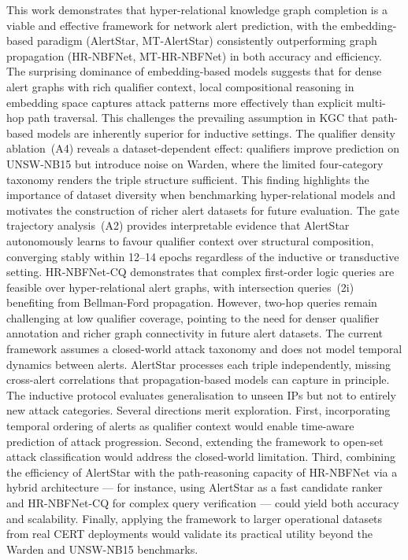 \documentclass[10pt,journal,compsoc]{IEEEtran}
\begin{document}
This work demonstrates that hyper-relational knowledge
graph completion is a viable and effective framework
for network alert prediction, with the embedding-based
paradigm (AlertStar, MT-AlertStar) consistently
outperforming graph propagation (HR-NBFNet,
MT-HR-NBFNet) in both accuracy and efficiency.
The surprising dominance of embedding-based models
suggests that for dense alert graphs with rich
qualifier context, local compositional reasoning in
embedding space captures attack patterns more
effectively than explicit multi-hop path traversal.
This challenges the prevailing assumption in KGC
that path-based models are inherently superior for
inductive settings.
The qualifier density ablation~(A4) reveals a
dataset-dependent effect: qualifiers improve
prediction on UNSW-NB15 but introduce noise on
Warden, where the limited four-category taxonomy
renders the triple structure sufficient. This
finding highlights the importance of dataset
diversity when benchmarking hyper-relational models
and motivates the construction of richer alert
datasets for future evaluation. The gate trajectory
analysis~(A2) provides interpretable evidence that
AlertStar autonomously learns to favour qualifier
context over structural composition, converging
stably within 12--14 epochs regardless of the
inductive or transductive setting.
HR-NBFNet-CQ demonstrates that complex first-order
logic queries are feasible over hyper-relational
alert graphs, with intersection queries~(2i)
benefiting from Bellman-Ford propagation. However,
two-hop queries remain challenging at low qualifier
coverage, pointing to the need for denser qualifier
annotation and richer graph connectivity in future
alert datasets.
The current framework assumes a closed-world attack
taxonomy and does not model temporal dynamics
between alerts. AlertStar processes each triple
independently, missing cross-alert correlations
that propagation-based models can capture in
principle. The inductive protocol evaluates
generalisation to unseen IPs but not to entirely
new attack categories.
Several directions merit exploration.
First, incorporating temporal ordering of alerts
as qualifier context would enable time-aware
prediction of attack progression.
Second, extending the framework to open-set attack
classification would address the closed-world
limitation.
Third, combining the efficiency of AlertStar with
the path-reasoning capacity of HR-NBFNet via a
hybrid architecture --- for instance, using
AlertStar as a fast candidate ranker and
HR-NBFNet-CQ for complex query verification ---
could yield both accuracy and scalability.
Finally, applying the framework to larger
operational datasets from real CERT deployments
would validate its practical utility beyond the
Warden and UNSW-NB15 benchmarks.
\end{document}
